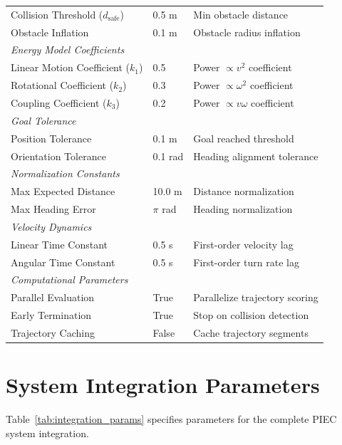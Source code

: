 \begin{table}[htbp]
\begin{tabular}{@{}lll@{}}
Collision Threshold ($d_{\text{safe}}$) & 0.5 m & Min obstacle distance \\
Obstacle Inflation & 0.1 m & Obstacle radius inflation \\
\midrule
\multicolumn{3}{l}{\textit{Energy Model Coefficients}} \\
Linear Motion Coefficient ($k_1$) & 0.5 & Power $\propto v^2$ coefficient \\
Rotational Coefficient ($k_2$) & 0.3 & Power $\propto \omega^2$ coefficient \\
Coupling Coefficient ($k_3$) & 0.2 & Power $\propto v\omega$ coefficient \\
\midrule
\multicolumn{3}{l}{\textit{Goal Tolerance}} \\
Position Tolerance & 0.1 m & Goal reached threshold \\
Orientation Tolerance & 0.1 rad & Heading alignment tolerance \\
\midrule
\multicolumn{3}{l}{\textit{Normalization Constants}} \\
Max Expected Distance & 10.0 m & Distance normalization \\
Max Heading Error & $\pi$ rad & Heading normalization \\
\midrule
\multicolumn{3}{l}{\textit{Velocity Dynamics}} \\
Linear Time Constant & 0.5 s & First-order velocity lag \\
Angular Time Constant & 0.5 s & First-order turn rate lag \\
\midrule
\multicolumn{3}{l}{\textit{Computational Parameters}} \\
Parallel Evaluation & True & Parallelize trajectory scoring \\
Early Termination & True & Stop on collision detection \\
Trajectory Caching & False & Cache trajectory segments \\
\bottomrule
\end{tabular}
\end{table}

\clearpage

\section{System Integration Parameters}
\label{sec:integration_params}

Table~\ref{tab:integration_params} specifies parameters for the complete PIEC system integration.

